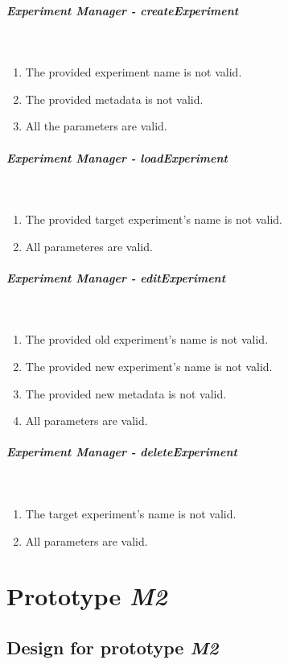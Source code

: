 \subparagraph{Experiment Manager - createExperiment} \mbox{}\\

\begin{enumerate}
    \item The provided experiment name is not valid.
    \item The provided metadata is not valid.
    \item All the parameters are valid.
\end{enumerate}

\subparagraph{Experiment Manager - loadExperiment} \mbox{}\\

\begin{enumerate}
    \item The provided target experiment's name is not valid.
    \item All parameteres are valid.
\end{enumerate}

\subparagraph{Experiment Manager - editExperiment} \mbox{}\\

\begin{enumerate}
    \item The provided old experiment's name is not valid.
    \item The provided new experiment's name is not valid.
    \item The provided new metadata is not valid.
    \item All parameters are valid.
\end{enumerate}

\subparagraph{Experiment Manager - deleteExperiment} \mbox{}\\

\begin{enumerate}
    \item The target experiment's name is not valid.
    \item All parameters are valid.
\end{enumerate}

\section{Prototype \emph{M2}}

\subsection{Design for prototype \emph{M2}}

